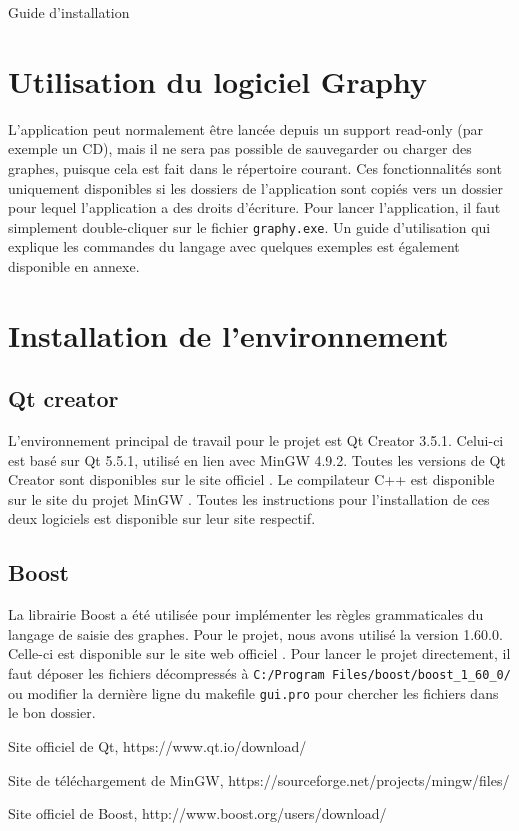 \documentclass[french]{article}
\begin{document}
	\centering
	\huge
	
	Guide d'installation
	
	\justifying
	\normalsize
	
	\section{Utilisation du logiciel Graphy}
	L'application peut normalement être lancée depuis un support read-only (par exemple un CD), mais il ne sera pas possible de sauvegarder ou charger des graphes, puisque cela est fait dans le répertoire courant. Ces fonctionnalités sont uniquement disponibles si les dossiers de l'application sont copiés vers un dossier pour lequel l'application a des droits d'écriture. Pour lancer l'application, il faut simplement double-cliquer sur le fichier \texttt{graphy.exe}. Un guide d'utilisation qui explique les commandes du langage avec quelques exemples est également disponible en annexe.
	
	\section{Installation de l'environnement}
		\subsection{Qt creator}
		L'environnement principal de travail pour le projet est Qt Creator 3.5.1. Celui-ci est basé sur Qt 5.5.1, utilisé en lien avec MinGW 4.9.2. Toutes les versions de Qt Creator sont disponibles sur le site officiel \cite{qt}. Le compilateur C++ est disponible sur le site du projet MinGW \cite{minGW}. Toutes les instructions pour l'installation de ces deux logiciels est disponible sur leur site respectif.
	
		\subsection{Boost}
		La librairie Boost a été utilisée pour implémenter les règles grammaticales du langage de saisie des graphes. Pour le projet, nous avons utilisé la version 1.60.0. Celle-ci est disponible sur le site web officiel \cite{boost}. Pour lancer le projet directement, il faut déposer les fichiers décompressés à \texttt{C:/Program Files/boost/boost_1_60_0/} ou modifier la dernière ligne du makefile \texttt{gui.pro} pour chercher les fichiers dans le bon dossier.
	
	\begin{thebibliography}{9}
		Site officiel de Qt, https://www.qt.io/download/
		
		Site de téléchargement de MinGW, https://sourceforge.net/projects/mingw/files/
		
		Site officiel de Boost, http://www.boost.org/users/download/
	\end{thebibliography}
	
\end{document}
